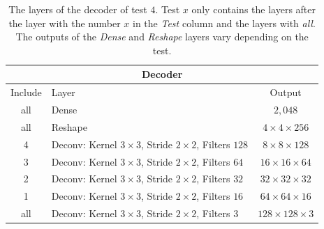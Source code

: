 \begin{center}
    \begin{table}[H]
        \centering
        \begin{tabular}{ | c | l | c | }
            \multicolumn{3}{c}{Decoder} \\ \hline
            Include &Layer & Output\\ \hline
            all &Dense                                                            & $2,048$                   \\
            all &Reshape                                                          & $4\times 4\times    256$  \\
            4   &Deconv: Kernel $3\times3$, Stride $2\times2$, Filters $128$      & $8\times 8\times    128$  \\
            3   &Deconv: Kernel $3\times3$, Stride $2\times2$, Filters $64 $      & $16\times 16\times  64 $  \\
            2   &Deconv: Kernel $3\times3$, Stride $2\times2$, Filters $32 $      & $32\times 32\times  32 $  \\
            1   &Deconv: Kernel $3\times3$, Stride $2\times2$, Filters $16 $      & $64\times 64\times  16 $  \\
            all &Deconv: Kernel $3\times3$, Stride $2\times2$, Filters $3  $      & $128\times 128\times3  $  \\
            \hline
        \end{tabular}
        \caption{The layers of the decoder of test $4$. 
        Test $x$ only contains the layers after the layer with the number
        $x$ in the \textit{Test} column and the layers with \textit{all}.
        The outputs of the \textit{Dense} and \textit{Reshape}
        layers vary depending on the test.} 
    \end{table}
\end{center}



